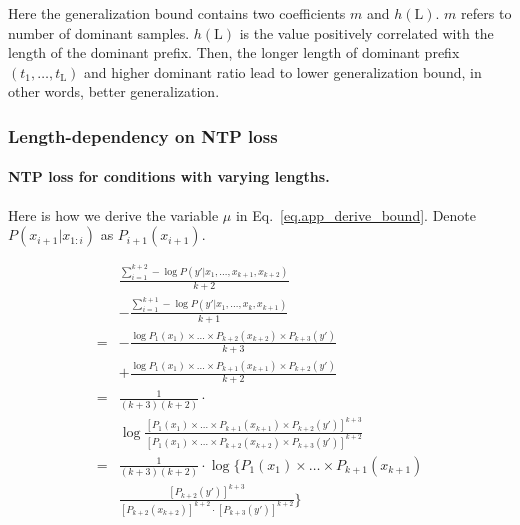 Here the generalization bound contains two coefficients $m$ and $h(\text{L})$. $m$ refers to number of dominant samples.
$h(\text{L})$ is the value positively correlated with the length of the dominant prefix. Then, the longer length of dominant prefix $({t}_1, \dots, {t}_\text{L})$ and higher dominant ratio lead to lower generalization bound, in other words, better generalization.


\subsubsection{Length-dependency on NTP loss}
\label{appendix:length_dependency}
\paragraph{NTP loss for conditions with varying lengths. }
Here is how we derive the variable $\mu$ in Eq.~\ref{eq.app_derive_bound}.
Denote \( P(x_{i+1}|x_{1:i}) \) as \( P_{i+1}(x_{i+1}) \).
\begin{small}
\begin{equation}
    \begin{aligned}
& \frac{\sum_{i=1}^{k+2} -\log P(y'|x_1, \ldots, x_{k+1}, x_{k+2})}{k+2} \\
& - \frac{\sum_{i=1}^{k+1} -\log P(y'|x_1, \ldots, x_{k}, x_{k+1})}{k+1} \\
= & -\frac{\log P_1(x_1)\times \dots  \times P_{k+2}(x_{k+2}) \times P_{k+3}(y') }{k+3} \\
& + \frac{\log P_1(x_1)\times \dots  \times P_{k+1}(x_{k+1}) \times P_{k+2}(y') }{k+2} \\
= & \frac{1}{(k+3)(k+2)} \cdot \\
& \log  \frac{[ P_1(x_1)\times \dots \times P_{k+1}(x_{k+1})\times P_{k+2}(y') ]^{k+3}}{[ P_1(x_1)\times \dots \times P_{k+2}(x_{k+2})\times P_{k+3}(y') ]^{k+2}} \\
= & \frac{1}{(k+3)(k+2)} \cdot \log \{ P_1(x_1)\times \dots \times P_{k+1}(x_{k+1}) \\
& \frac{[P_{k+2}(y')]^{k+3}}{[P_{k+2}(x_{k+2})]^{k
+2}\cdot [P_{k+3}(y')]^{k+2}} \}
\end{aligned}
\end{equation}
\end{small}

